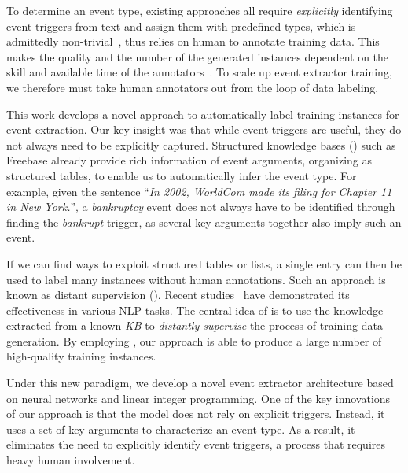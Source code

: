 To determine an event type, existing approaches  all require \emph{explicitly} identifying event triggers from text and assign them with predefined types, %
which is admittedly non-trivial~\FIXME{\cite{}}, thus relies on human to annotate training data. 
This makes the quality and the number of the generated instances dependent on the skill and available time of the
annotators~\cite{aguilar2014comparison,song2015light}. To scale up event extractor training, we therefore must take human annotators out
from the loop of data labeling.


This work develops a novel approach to automatically label training instances for event extraction. Our key insight was that while event
triggers are useful, they do not always need to be explicitly captured. Structured knowledge bases (\KBs) such as Freebase already provide
rich information of event arguments, organizing as structured tables, to enable us to automatically infer the event type. For example, given the sentence ``\textit{In 2002, WorldCom made its filing for Chapter 11 in New York.}'', a \emph{bankruptcy} event does not always have to be identified through finding the \emph{bankrupt} trigger, as several key arguments together also imply such an event. 


If we can find ways to exploit structured tables or lists, a single entry can then be used to label many instances without %
human annotations. Such an approach is known as distant supervision (\DS). Recent
studies~\cite{mintz2009distant,zeng2015distant} have demonstrated its effectiveness in various NLP tasks. The central idea of \DS is to use
the knowledge extracted from a known \textit{KB} to \emph{distantly supervise} the process of training data generation. %
By employing \DS, our approach is able to produce a large number of high-quality training instances.

Under this new \DS paradigm, we develop a novel event extractor architecture based on neural networks and linear integer programming. One
of the key innovations of our approach is that the model does not rely on explicit triggers. Instead, it uses a set of key arguments to
characterize an event type. As a result, it eliminates the need to explicitly identify event triggers, a process that requires heavy human
involvement.

